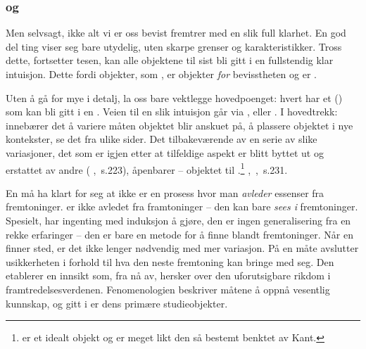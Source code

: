 \subsubsection{ og }
Men selvsagt, ikke alt vi er oss bevist fremtrer med en slik 
full klarhet. En god del ting viser seg bare utydelig, uten skarpe 
grenser og karakteristikker. Tross dette, fortsetter tesen, kan alle 
objektene til sist bli gitt i en fullstendig klar intuisjon. 
Dette fordi objekter, som , er objekter {\em for} 
bevisstheten og er .

Uten {\aa} g{\aa} for mye i detalj, la oss bare vektlegge 
hovedpoenget: hvert  har et  
() som kan bli gitt i en . Veien til 
en slik intuisjon g{\aa}r via , eller 
. I hovedtrekk:  inneb{\ae}rer det {\aa} 
variere m{\aa}ten objektet blir anskuet p{\aa}, {\aa} plassere 
objektet i nye kontekster, se det fra ulike sider. Det 
tilbakev{\ae}rende av en serie av slike variasjoner, det som er igjen 
etter at tilfeldige aspekt er blitt byttet ut og erstattet av andre ( \cite{RI},~s.223), 
{\aa}penbarer  -- objektet til 
.\footnote{ er et idealt objekt og 
 er meget likt den  
s{\aa} bestemt benktet av Kant.} ,~\cite{RI},~s.231.

En m{\aa} ha klart for seg at  ikke er en prosess hvor 
man {\em avleder} essenser fra fremtoninger.  er ikke avledet 
fra framtoninger -- den kan bare {\em sees i} fremtoninger. Spesielt, 
 har ingenting med induksjon {\aa} gj{\o}re, den er 
ingen generalisering fra en rekke erfaringer -- den er bare en metode 
for {\aa} finne  blandt fremtoninger.
N{\aa}r en  finner sted, er det ikke lenger 
n{\o}dvendig med mer variasjon. P{\aa} en m{\aa}te avslutter 
 usikkerheten i forhold til hva den neste 
fremtoning kan bringe med seg. Den etablerer en innsikt som, fra 
n{\aa} av, hersker over den uforutsigbare rikdom i 
framtredelsesverdenen.
Fenomenologien beskriver m{\aa}tene {\aa} oppn{\aa} vesentlig 
kunnskap, og  gitt i  er dens
prim{\ae}re studieobjekter.

